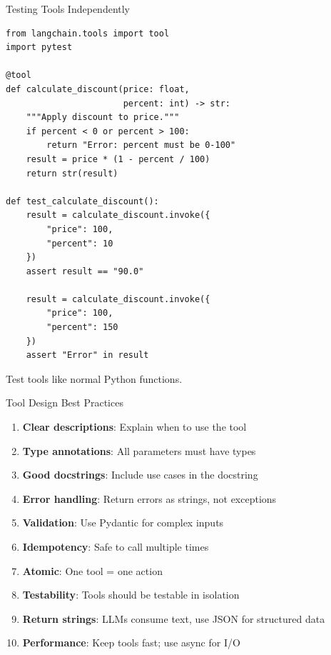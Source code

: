 \documentclass[aspectratio=169,11pt]{beamer}
\begin{document}
\begin{frame}[fragile,shrink=2]{Testing Tools Independently}
\begin{codebox}
\begin{lstlisting}
from langchain.tools import tool
import pytest

@tool
def calculate_discount(price: float,
                       percent: int) -> str:
    """Apply discount to price."""
    if percent < 0 or percent > 100:
        return "Error: percent must be 0-100"
    result = price * (1 - percent / 100)
    return str(result)

def test_calculate_discount():
    result = calculate_discount.invoke({
        "price": 100,
        "percent": 10
    })
    assert result == "90.0"

    result = calculate_discount.invoke({
        "price": 100,
        "percent": 150
    })
    assert "Error" in result
\end{lstlisting}
\end{codebox}

Test tools like normal Python functions.
\end{frame}

\begin{frame}[fragile]{Tool Design Best Practices}
\begin{enumerate}\setlength{\itemsep}{1pt}
  \item \textbf{Clear descriptions}: Explain when to use the tool
  \item \textbf{Type annotations}: All parameters must have types
  \item \textbf{Good docstrings}: Include use cases in the docstring
  \item \textbf{Error handling}: Return errors as strings, not exceptions
  \item \textbf{Validation}: Use Pydantic for complex inputs
  \item \textbf{Idempotency}: Safe to call multiple times
  \item \textbf{Atomic}: One tool = one action
  \item \textbf{Testability}: Tools should be testable in isolation
  \item \textbf{Return strings}: LLMs consume text, use JSON for structured data
  \item \textbf{Performance}: Keep tools fast; use async for I/O
\end{enumerate}
\end{frame}
\end{document}
